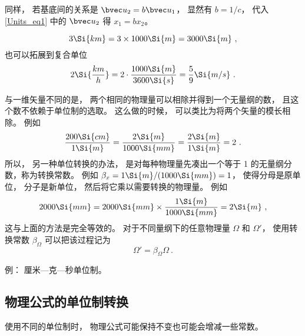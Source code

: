 同样， 若基底间的关系是 $\bvec u_2 = b\bvec u_1$， 显然有 $b = 1/c$， 代入\autoref{Units_eq1} 中的 $\bvec u_2$ 得 $x_1 = b x_2$。

\begin{example}{}
\begin{equation}
3 \Si{km} = 3\times 1000\Si{m} = 3000\Si{m}~,
\end{equation}
也可以拓展到复合单位
\begin{equation}
2 \Si{\frac{km}{h}} = 2\cdot \frac{1000 \Si{m}}{3600 \Si{s}} = \frac{5}{9}\Si{m/s}~.
\end{equation}
\end{example}

与一维矢量不同的是， 两个相同的物理量可以相除并得到一个无量纲的数， 且这个数不依赖于单位制的选取。 这么做的时候， 可以类比为将两个矢量的模长相除。 例如
\begin{equation}
\frac{200\Si{cm}}{1\Si{m}} = \frac{2\Si{m}}{1000\Si{mm}} = \frac{2\Si{m}}{1\Si{m}} = 2~.
\end{equation}
所以， 另一种单位转换的办法， 是对每种物理量先凑出一个等于 1 的无量纲分数，称为转换常数。 例如 $\beta_x = 1\Si{m}/(1000\Si{mm}) = 1$， 使得分母是原单位， 分子是新单位， 然后将它乘以需要转换的物理量。 例如
\begin{equation}
2000\Si{mm} = 2000\Si{mm} \times \frac{1\Si{m}}{1000\Si{mm}} = 2\Si{m}~,
\end{equation}
这与上面的方法是完全等效的。 对于不同量纲下的任意物理量 $\Omega$ 和 $\Omega'$， 使用转换常数 $\beta_\Omega$ 可以把该过程记为
\begin{equation}
\Omega' = \beta_\Omega \Omega~.
\end{equation}

例： 厘米—克—秒单位制。

\subsection{物理公式的单位制转换}
使用不同的单位制时， 物理公式可能保持不变也可能会增减一些常数。

